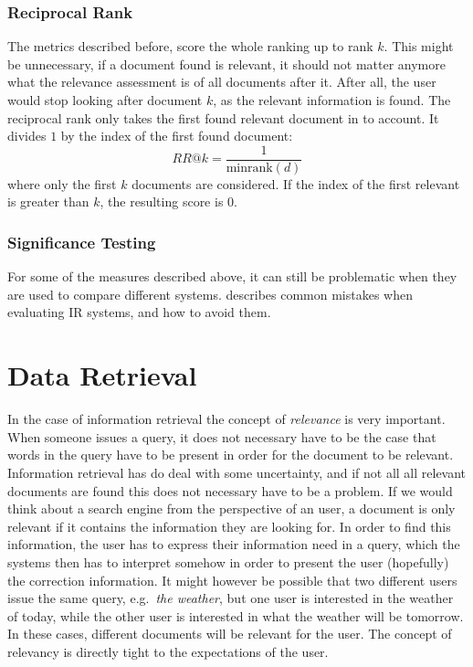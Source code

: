 \subsubsection{Reciprocal Rank} 
The metrics described before, score the whole ranking up to rank $k$. This might be unnecessary, if a document found is relevant, it should not matter anymore what the relevance assessment is of all documents after it. After all, the user would stop looking after document $k$, as the relevant information is found. The reciprocal rank only takes the first found relevant document in to account. It divides $1$ by the index of the first found document:
\begin{equation}
	\textit{RR@k} = \frac{1}{\text{minrank}(d)}
\end{equation}
where only the first $k$ documents are considered. If the index of the first relevant is greater than $k$, the resulting score is $0$.

\subsubsection{Significance Testing}
For some of the measures described above, it can still be problematic when they are used to compare different systems.  describes common mistakes when evaluating IR systems, and how to avoid them.

\section{Data Retrieval}
In the case of information retrieval the concept of \emph{relevance} is very important. When someone issues a query, it does not necessary have to be the case that words in the query have to be present in order for the document to be relevant. Information retrieval has do deal with some uncertainty, and if not all all relevant documents are found this does not necessary have to be a problem. If we would think about a search engine from the perspective of an user, a document is only relevant if it contains the information they are looking for. In order to find this information, the user has to express their information need in a query, which the systems then has to interpret somehow in order to present the user (hopefully) the correction information. 
It might however be possible that two different users issue the same query, e.g.\ \emph{the weather}, but one user is interested in the weather of today, while the other user is interested in what the weather will be tomorrow. In these cases, different documents will be relevant for the user. The concept of relevancy is directly tight to the expectations of the user.

